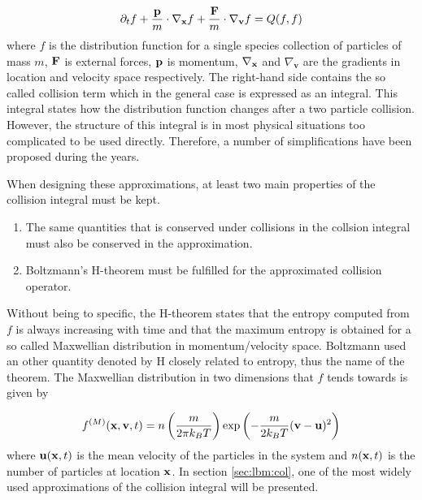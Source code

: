 \begin{equation}\label{eq:lbm:boltzmann-eq}
\partial_t f + \frac{\mathbf{p}}{m} \cdot \nabla_{\mathbf{x}}f + \frac{\mathbf{F}}{m} \cdot
\nabla_{\mathbf{v}}f = Q(f, f)
\end{equation}
where $f$ is the distribution function for a single species collection
of particles of mass $m$, $\mathbf{F}$ is external forces, $\mathbf{p}$ is momentum,
$\nabla_{\mathbf{x}}$ and $\nabla_{\mathbf{v}}$ are the gradients in location
and velocity space respectively. The right-hand side contains the so
called collision term which in the general case is expressed as an
integral. This integral states how the distribution function changes
after a two particle collision. However, the structure of this
integral is in most physical situations too complicated to be used
directly. Therefore, a number of simplifications have been proposed
during the years.

When designing these approximations, at least two main properties of
the collision integral must be kept. \cite{wolf-gladrow}

\begin{enumerate}
  \item The same quantities that is conserved under collisions in the
    collsion integral must also be conserved in the approximation.
  \item Boltzmann's H-theorem must be fulfilled for the
    approximated collision operator.
\end{enumerate}

Without being to specific, the H-theorem states that the entropy
computed from $f$ is always increasing with time and that the maximum
entropy is obtained for a so called Maxwellian distribution in
momentum/velocity space. Boltzmann used an other quantity denoted by H
closely related to entropy, thus the name of the theorem. The
Maxwellian distribution in two dimensions that $f$ tends towards is
given by

\begin{equation}\label{eq:lbm:maxwell}
f^{(M)}(\mathbf{x}, \mathbf{v}, t) = n \left ( \frac{m}{2 \pi k_B T} \right )
\exp{\left( -\frac{m}{2 k_B T} (\mathbf{v} - \ensuremath{\mathbf{u}})^2\right)}
\end{equation} 
where $\mathbf{u}(\mathbf{x}, t)$ is the mean velocity of the particles in the system and
$n(\mathbf{x}, t)$ is the number of particles at location $\mathbf{x}$. In section
\ref{sec:lbm:col}, one of the most widely used approximations of the
collision integral will be presented.

